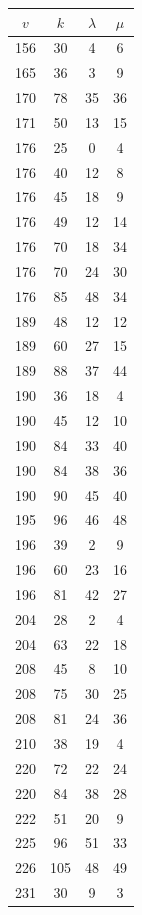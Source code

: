 \documentclass[12pt]{amsproc} %
\theoremstyle{definition}\newtheorem{defn}[thm]{Definition}
\theoremstyle{definition}\newtheorem{rem}[thm]{Remark}
\theoremstyle{definition}\newtheorem{ex}[thm]{Example}
\begin{document}
\begin{table}[ht]
\begin{minipage}{0.25\textwidth}
    \end{minipage}
    \hfill
    \begin{minipage}{0.25\textwidth}
        \centering
        \begin{tabular}{c|c|c|c}
            $v$ & $k$ & $\lambda$ & $\mu$ \\ 
            \hline
		156 & 30 & 4 & 6 \\ 
		165 & 36 & 3 & 9 \\ 
		170 & 78 & 35 & 36 \\ 
		171 & 50 & 13 & 15 \\ 
		176 & 25 & 0 & 4 \\ 
		176 & 40 & 12 & 8 \\ 
		176 & 45 & 18 & 9 \\ 
		176 & 49 & 12 & 14 \\ 
		176 & 70 & 18 & 34 \\ 
		176 & 70 & 24 & 30 \\ 
		176 & 85 & 48 & 34 \\ 
		189 & 48 & 12 & 12 \\ 
		189 & 60 & 27 & 15 \\ 
		189 & 88 & 37 & 44 \\ 
		190 & 36 & 18 & 4 \\ 
		190 & 45 & 12 & 10 \\ 
		190 & 84 & 33 & 40 \\ 
		190 & 84 & 38 & 36 \\ 
		190 & 90 & 45 & 40 \\ 
		195 & 96 & 46 & 48 \\ 
		196 & 39 & 2 & 9 \\ 
		196 & 60 & 23 & 16 \\ 
		196 & 81 & 42 & 27 \\ 
		204 & 28 & 2 & 4 \\ 
		204 & 63 & 22 & 18 \\ 
		208 & 45 & 8 & 10 \\ 
		208 & 75 & 30 & 25 \\ 
		208 & 81 & 24 & 36 \\ 
		210 & 38 & 19 & 4 \\ 
		220 & 72 & 22 & 24 \\ 
		220 & 84 & 38 & 28 \\ 
		222 & 51 & 20 & 9 \\ 
		225 & 96 & 51 & 33 \\ 
		226 & 105 & 48 & 49 \\ 
		231 & 30 & 9 & 3 \\ 

\end{tabular}
\end{minipage}
\end{table}
\end{document}
